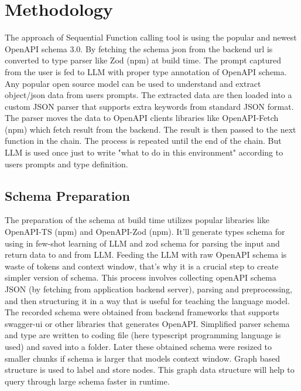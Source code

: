 \documentclass[conference]{IEEEtran}
\begin{document}
\section{Methodology}
The approach of Sequential Function calling tool is using the popular and newest OpenAPI schema 3.0. By fetching the schema json from the backend url is converted to type parser like Zod (npm) at build time. The prompt captured from the user is fed to LLM with proper type annotation of OpenAPI schema. Any popular open source model can be used to understand and extract object/json data from users prompts. The extracted data are then loaded into a custom JSON parser that supports extra keywords from standard JSON format. The parser moves the data to OpenAPI clients libraries like OpenAPI-Fetch (npm) which fetch result from the backend. The result is then passed to the next function in the chain. The process is repeated until the end of the chain. But LLM is used once just to write "what to do in this environment" according to users prompts and type definition.

\subsection{Schema Preparation}\label{AA}
The preparation of the schema at build time utilizes popular libraries like OpenAPI-TS (npm) and OpenAPI-Zod (npm). It'll generate types schema for using in few-shot learning of LLM and zod schema for parsing the input and return data to and from LLM. Feeding the LLM with raw OpenAPI schema is waste of tokens and context window, that's why it is a crucial step to create simpler version of schema. This process involves collecting openAPI schema JSON (by fetching from application backend server), parsing and preprocessing, and then structuring it in a way that is useful for teaching the language model. The recorded schema were obtained from backend frameworks that supports swagger-ui or other libraries that generates OpenAPI. Simplified parser schema and type are written to coding file (here typescript programming language is used) and saved into a folder. Later these obtained schema were resized to smaller chunks if schema is larger that models context window. Graph based structure is used to label and store nodes. This graph data structure will help to query through large schema faster in runtime. 
\end{document}

